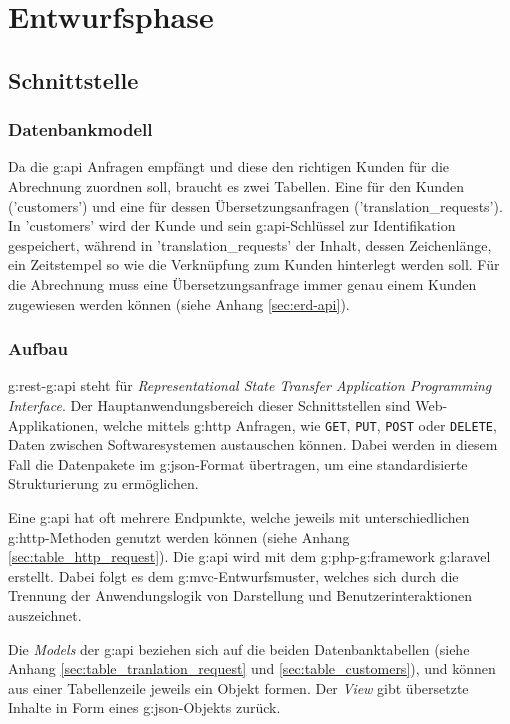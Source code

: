 \section{Entwurfsphase}
\subsection{Schnittstelle}

\subsubsection{Datenbankmodell}
Da die \gls{g:api} Anfragen empfängt und diese den richtigen Kunden für die Abrechnung zuordnen soll, braucht es zwei Tabellen. 
Eine für den Kunden ('customers') und eine für dessen Übersetzungsanfragen ('translation\_requests').
In 'customers' wird der Kunde und sein \gls{g:api}-Schlüssel zur Identifikation gespeichert, 
während in 'translation\_requests' der Inhalt, dessen Zeichenlänge, ein Zeitstempel so wie die Verknüpfung zum Kunden hinterlegt werden soll.
Für die Abrechnung muss eine Übersetzungsanfrage immer genau einem Kunden zugewiesen werden können (siehe Anhang \ref{sec:erd-api}).

\subsubsection{Aufbau}
\gls{g:rest}-\gls{g:api} steht für \emph{Representational State Transfer Application Programming Interface}. 
Der Hauptanwendungsbereich dieser Schnittstellen sind Web-Applikationen, welche mittels \gls{g:http} Anfragen, wie \texttt{GET}, \texttt{PUT}, \texttt{POST} oder \texttt{DELETE}, Daten zwischen Softwaresystemen austauschen können.
Dabei werden in diesem Fall die Datenpakete im \gls{g:json}-Format übertragen, um eine standardisierte Strukturierung zu ermöglichen.

Eine \gls{g:api} hat oft mehrere Endpunkte, welche jeweils mit unterschiedlichen \gls{g:http}-Methoden genutzt werden können (siehe Anhang \ref{sec:table_http_request}).
Die \gls{g:api} wird mit dem \gls{g:php}-\gls{g:framework} \gls{g:laravel} erstellt. 
Dabei folgt es dem \gls{g:mvc}-Entwurfsmuster, welches sich durch die Trennung der Anwendungslogik von Darstellung und Benutzerinteraktionen auszeichnet.

Die \emph{Models} der \gls{g:api} beziehen sich auf die beiden Datenbanktabellen (siehe Anhang \ref{sec:table_tranlation_request} und \ref{sec:table_customers}), und können aus einer Tabellenzeile jeweils ein Objekt formen.
Der \emph{View} gibt übersetzte Inhalte in Form eines \gls{g:json}-Objekts zurück.


